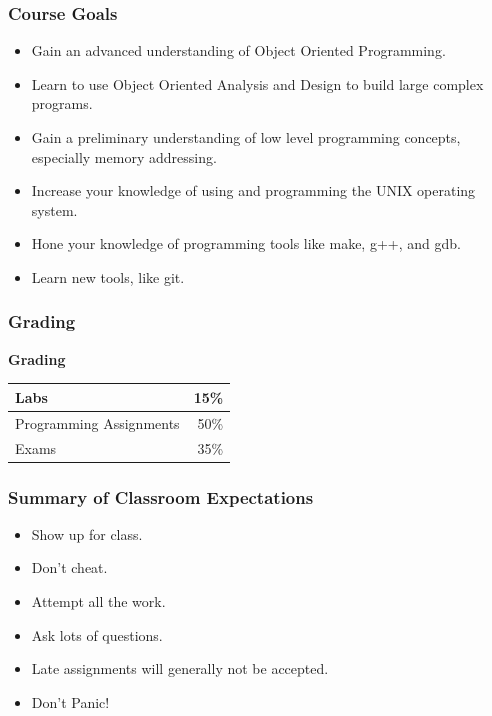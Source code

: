 \documentclass[handout]{beamer}
\begin{document}
\begin{frame}
   \frametitle{Course Goals}
   \begin{itemize}
      \item Gain an advanced understanding of Object Oriented Programming.
      \item Learn to use Object Oriented Analysis and Design to build large complex 
            programs. 
      \item Gain a preliminary understanding of low level programming concepts,
            especially memory addressing.
      \item Increase your knowledge of using and programming the UNIX operating       
            system.
      \item Hone your knowledge of programming tools like make, g++, and gdb.
      \item Learn new tools, like git.
   \end{itemize}
\end{frame}

\begin{frame}
    \frametitle{Grading}
    \textbf{Grading}
    
    \begin{tabular}{|l|r|}
       \hline
       Labs & 15\%\\
       \hline
       Programming Assignments & 50\%\\
       \hline
       Exams & 35\%\\
       \hline
    \end{tabular}
\end{frame}

\begin{frame}
   \frametitle{Summary of Classroom Expectations}
   \begin{itemize}
      \item Show up for class.
      \item Don't cheat.
      \item Attempt all the work.
      \item Ask lots of questions.
      \item Late assignments will generally not be accepted.
      \item Don't Panic!
   \end{itemize}
\end{frame}
\end{document}

